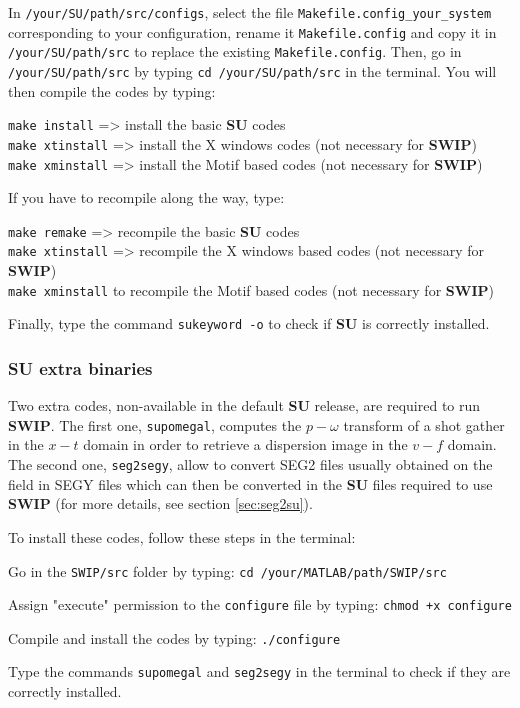 \documentclass[twoside,a4paper]{article}
\def\SWIP{\textbf{SWIP}}
\def\SU{\textbf{SU}}
\begin{document}
In \verb|/your/SU/path/src/configs|, select the file \verb|Makefile.config_your_system| corresponding to your configuration, rename it \verb|Makefile.config| and copy it in \verb|/your/SU/path/src| to replace the existing \verb|Makefile.config|. Then, go in \verb|/your/SU/path/src| by typing \verb|cd /your/SU/path/src| in the terminal. You will then compile the codes by typing:

\verb|make install| => install the basic {\SU} codes\\
\verb|make xtinstall| => install the X windows codes (not necessary for {\SWIP})\\
\verb|make xminstall| => install the Motif based codes (not necessary for {\SWIP})

If you have to recompile along the way, type:

\verb|make remake| => recompile the basic {\SU} codes\\
\verb|make xtinstall| => recompile the X windows based codes (not necessary for {\SWIP})\\
\verb|make xminstall| to recompile the Motif based codes (not necessary for {\SWIP})

Finally, type the command \verb|sukeyword -o| to check if {\SU} is correctly installed.

\subsubsection{SU extra binaries}
Two extra codes, non-available in the default {\SU} release, are required to run {\SWIP}. The first one, \verb|supomegal|, computes the $p-\omega$ transform of a shot gather in the $x-t$ domain in order to retrieve a dispersion image in the $v-f$ domain. The second one, \verb|seg2segy|, allow to convert SEG2 files usually obtained on the field in SEGY files which can then be converted in the {\SU} files required to use {\SWIP} (for more details, see section \ref{sec:seg2su}).

To install these codes, follow these steps in the terminal:

Go in the \verb|SWIP/src| folder by typing: \verb|cd /your/MATLAB/path/SWIP/src|

Assign "execute" permission to the \verb|configure| file by typing: \verb|chmod +x configure|

Compile and install the codes by typing: \verb|./configure|

Type the commands \verb|supomegal| and \verb|seg2segy| in the terminal to check if they are correctly installed.
\end{document}
